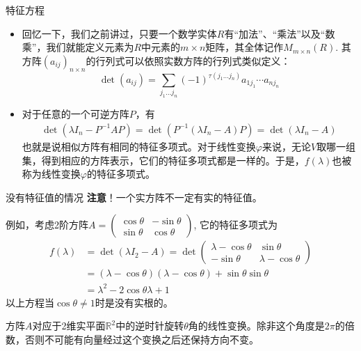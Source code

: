 \documentclass[10pt]{beamer}
\begin{document}
\begin{frame}

\begin{block}{特征方程}
\begin{itemize}
\item 回忆一下，我们之前讲过，只要一个数学实体$R$有``加法''、``乘法''以及``数乘''，我们就能定义元素为$R$中元素的$m\times n$矩阵，其全体记作$M_{m\times n}(R)$. 其方阵$(a_{ij})_{n\times n}$的行列式可以依照实数方阵的行列式类似定义：
$$\det(a_{ij}) = \sum\limits_{j_1\ldots j_n} (-1)^{\tau(j_1\ldots j_n)} a_{1j_1}\cdots a_{nj_n}$$
\item 对于任意的一个可逆方阵$P$，有
\begin{align*}
\det(\lambda I_n - P^{-1}AP) = \det (P^{-1}(\lambda I_n - A)P) = \det(\lambda I_n - A)
\end{align*}
也就是说相似方阵有相同的特征多项式。对于线性变换$\varphi$来说，无论$V$取哪一组集，得到相应的方阵表示，它们的特征多项式都是一样的。于是，$f(\lambda)$也被称为线性变换$\varphi$的特征多项式。
\end{itemize}
\end{block}

\end{frame}


\begin{frame}

\begin{block}{没有特征值的情况}
{\bfseries 注意}！一个实方阵不一定有实的特征值。

\vspace{1em}
\pause

例如，考虑2阶方阵$A = \begin{pmatrix} \cos\theta & -\sin\theta \\ \sin\theta & \cos\theta \end{pmatrix}$, 它的特征多项式为
\begin{align*}
f(\lambda) &= \det (\lambda I_2 - A) = \det \begin{pmatrix} \lambda - \cos\theta & \sin\theta \\ -\sin\theta & \lambda - \cos\theta \end{pmatrix} \\
& = (\lambda - \cos\theta)(\lambda - \cos\theta) + \sin\theta\sin\theta \\
& = \lambda^2 - 2\cos\theta\lambda + 1
\end{align*}
以上方程当$\cos\theta\neq 1$时是没有实根的。

\vspace{1em}
\pause

方阵$A$对应于2维实平面$\mathbb{R}^2$中的逆时针旋转$\theta$角的线性变换。除非这个角度是$2\pi$的倍数，否则不可能有向量经过这个变换之后还保持方向不变。
\end{block}

\end{frame}
\end{document}
